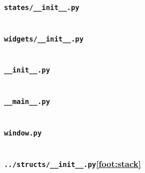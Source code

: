 \documentclass{report}
\begin{document}
\subsubsection*{\texttt{states/\_\_init\_\_.py}}
\inputminted{python}{../../prototype/states/__init__.py}
\subsubsection*{\texttt{widgets/\_\_init\_\_.py}}
\inputminted{python}{../../prototype/widgets/__init__.py}
\subsubsection*{\texttt{\_\_init\_\_.py}}
\inputminted{python}{../../prototype/__init__.py}
\subsubsection*{\texttt{\_\_main\_\_.py}}
\inputminted{python}{../../prototype/__main__.py}
\newpage
\subsubsection*{\texttt{window.py}}
\inputminted{python}{../../prototype/window.py}
\subsubsection*{\texttt{../structs/\_\_init\_\_.py}\ref{foot:stack}}
\inputminted[firstline=23, lastline=41]{python}{../../structs/__init__.py}
\end{document}
